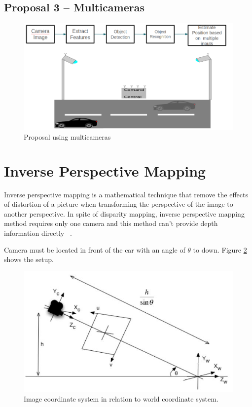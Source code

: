 \subsection{Proposal 3 – Multicameras}
\begin{figure}[H]
\centering
\includegraphics[width=\textwidth]{imagens/proposal3.png}
\caption{Proposal using multicameras}
\label{fig:proposal3}
\end{figure}



\section{Inverse Perspective Mapping }
Inverse perspective mapping is a mathematical technique that remove the effects of distortion of a picture when transforming the perspective of the image to another perspective. In spite of disparity mapping, inverse perspective mapping method requires only one camera and this method can't provide depth information directly ~\cite{Tuohy2010}.

Camera must be located in front of the car with an angle of \(\theta\) to down. Figure \ref{fig:ImageRelationSystem} shows the setup.

\begin{figure}[h]
\centering
\includegraphics[scale=0.5]{imagens/Inverse Perspective Mapping.JPG}
\caption{Image coordinate system in relation to world coordinate
system.}
\label{fig:ImageRelationSystem}
\end{figure}
\par


